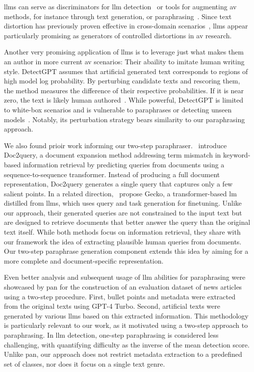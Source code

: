 \acp{llm} can serve as discriminators for \ac{llm} detection~\citep{futrzynski_pairwise_2021} or tools for augmenting \ac{av} methods, for instance through text generation, or paraphrasing~\citep{mao_raidar_2024,baradia_mirror_2025}.
Since text distortion has previously proven effective in cross-domain scenarios~\citep{bischoff_importance_2020}, \acp{llm} appear particularly promising as generators of controlled distortions in \ac{av} research.

Another very promising application of \acp{llm} is to leverage just what makes them an author in more current \ac{av} scenarios: Their abaility to imitate human writing style.
DetectGPT assumes that artificial generated text corresponds to regions of high model log probability. 
By perturbing candidate texts and rescoring them, the method measures the difference of their respective probabilities.
If it is near zero, the text is likely human authored~\citep{mitchell_detectgpt_2023}. 
While powerful, DetectGPT is limited to white-box scenarios %
and is vulnerable to paraphrases or detecting unseen models~\citep{Wu_ODD_challenges_2025}.
Notably, its perturbation strategy bears similarity to our paraphrasing approach.

We also found prioir work informing our two-step paraphraser.
\citet{nogueira_doc2query_2019}\ introduce Doc2query, a document expansion method addressing term mismatch in keyword-based information retrieval by predicting queries from documents using a sequence-to-sequence transformer. 
Instead of producing a full document representation, Doc2query generates a single query that captures only a few salient points. 
In a related direction, \citet{lee_gecko_2024}\ propose Gecko, a transformer-based \ac{lm} distilled from \acp{llm}, which uses query and task generation for finetuning. 
Unlike our approach, their generated queries are not constrained to the input text but are designed to retrieve documents that better answer the query than the original text itself. 
While both methods focus on information retrieval, they share with our framework the idea of extracting plausible human queries from documents. 
Our two-step paraphrase generation component \pextractor{} extends this idea by aiming for a more complete and document-specific representation.

Even better analysis and subsequent usage of \ac{llm} abilities for paraphrasing were showcased by
\acs{pan} for the construction of an evaluation dataset of news articles using a two-step procedure.
First, bullet points and metadata were extracted from the original texts using GPT-4 Turbo.
Second, artificial texts were generated by various \acp{llm} based on this extracted information. 
This methodology is particularly relevant to our work, as it motivated using a two-step approach to paraphrasing. 
In \ac{llm} detection, one-step paraphrasing is considered less challenging, with \citet{bevendorff_overview_2024} quantifying difficulty as the inverse of the mean detection score.
Unlike \acs{pan}, our approach does not restrict metadata extraction to a predefined set of classes, nor does it focus on a single text genre. 

